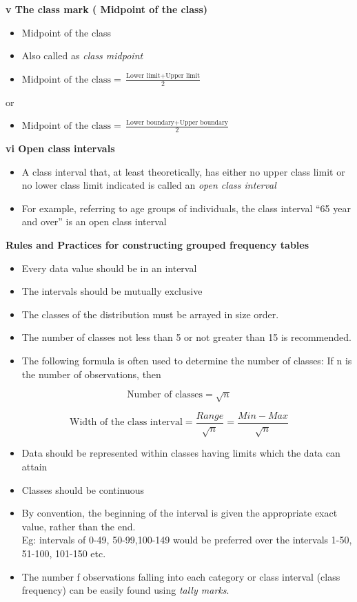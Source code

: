 \documentclass[]{book}
\providecommand{\tightlist}{%
  \setlength{\itemsep}{0pt}\setlength{\parskip}{0pt}}
\begin{document}
\textbf{v The class mark ( Midpoint of the class)}

\begin{itemize}
\tightlist
\item
  Midpoint of the class
\item
  Also called as \emph{class midpoint}
\item
  \(\text{Midpoint of the class} = \frac{\text{Lower limit} + \text{Upper limit}}{2}\)
\end{itemize}

or

\begin{itemize}
\tightlist
\item
  \(\text{Midpoint of the class} = \frac{\text{Lower boundary} + \text{Upper boundary}}{2}\)
\end{itemize}

\textbf{vi Open class intervals}

\begin{itemize}
\item
  A class interval that, at least theoretically, has either no upper class limit or no lower class limit indicated is called an \emph{open class interval}
\item
  For example, referring to age groups of individuals, the class interval ``65 year and over'' is an open class interval
\end{itemize}

\textbf{Rules and Practices for constructing grouped frequency tables}

\begin{itemize}
\tightlist
\item
  Every data value should be in an interval
\item
  The intervals should be mutually exclusive
\item
  The classes of the distribution must be arrayed in size order.
\item
  The number of classes not less than 5 or not greater than 15 is recommended.
\item
  The following formula is often used to determine the number of classes:
  If n is the number of observations, then
\end{itemize}

\[\text{Number of classes} = \sqrt{n}\]

\[\text{Width of the class interval} = \frac{Range}{\sqrt{n}}= \frac{Min-Max}{\sqrt{n}}\]

\begin{itemize}
\tightlist
\item
  Data should be represented within classes having limits which the data can attain
\item
  Classes should be continuous
\item
  By convention, the beginning of the interval is given the appropriate exact value, rather than the end.\\
  Eg: intervals of 0-49, 50-99,100-149 would be preferred over the intervals 1-50, 51-100, 101-150 etc.
\item
  The number f observations falling into each category or class interval (class frequency) can be easily found using \emph{tally marks}.
\end{itemize}
\end{document}
